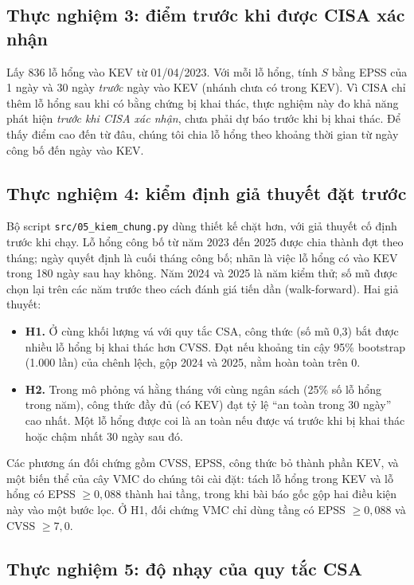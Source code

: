 \documentclass[runningheads]{llncs}
\begin{document}
\subsection{Thực nghiệm 3: điểm trước khi được CISA xác nhận}

Lấy 836 lỗ hổng vào KEV từ 01/04/2023. Với mỗi lỗ hổng, tính $S$ bằng EPSS của 1 ngày và 30
ngày \emph{trước} ngày vào KEV (nhánh chưa có trong KEV). Vì CISA chỉ thêm lỗ hổng sau khi có bằng chứng
bị khai thác, thực nghiệm này đo khả năng phát hiện \emph{trước khi CISA xác nhận}, chưa phải
dự báo trước khi bị khai thác. Để thấy điểm cao đến từ đâu, chúng tôi chia lỗ hổng theo khoảng
thời gian từ ngày công bố đến ngày vào KEV.

\subsection{Thực nghiệm 4: kiểm định giả thuyết đặt trước}

Bộ script \texttt{src/05\_kiem\_chung.py} dùng thiết kế chặt hơn, với giả thuyết cố định
trước khi chạy. Lỗ hổng công bố từ năm 2023 đến 2025 được chia thành đợt theo tháng; ngày quyết
định là cuối tháng công bố; nhãn là việc lỗ hổng có vào KEV trong 180 ngày sau hay không. Năm 2024 và 2025 là năm
kiểm thử; số mũ được chọn lại trên các năm trước theo cách đánh giá tiến dần (walk-forward). Hai giả thuyết:
\begin{itemize}
\item \textbf{H1.} Ở cùng khối lượng vá với quy tắc CSA, công thức (số mũ 0,3) bắt được
nhiều lỗ hổng bị khai thác hơn CVSS. Đạt nếu khoảng tin cậy 95\% bootstrap (1.000 lần) của
chênh lệch, gộp 2024 và 2025, nằm hoàn toàn trên 0.
\item \textbf{H2.} Trong mô phỏng vá hằng tháng với cùng ngân sách (25\% số lỗ hổng trong
năm), công thức đầy đủ (có KEV) đạt tỷ lệ ``an toàn trong 30 ngày'' cao nhất. Một lỗ hổng
được coi là an toàn nếu được vá trước khi bị khai thác hoặc chậm nhất 30 ngày sau đó.
\end{itemize}
Các phương án đối chứng gồm CVSS, EPSS, công thức bỏ thành phần KEV, và một biến thể của cây VMC do chúng tôi cài
đặt: tách lỗ hổng trong KEV và lỗ hổng có EPSS $\ge 0{,}088$ thành hai tầng, trong khi bài báo
gốc gộp hai điều kiện này vào một bước lọc. Ở H1, đối chứng VMC chỉ dùng tầng có EPSS
$\ge 0{,}088$ và CVSS $\ge 7{,}0$.

\subsection{Thực nghiệm 5: độ nhạy của quy tắc CSA}
\end{document}
